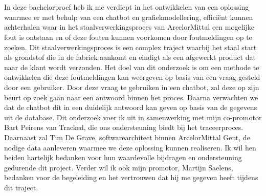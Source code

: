 
\chapter*{}%
\label{ch:voorwoord}

In deze bachelorproef heb ik me verdiept in het ontwikkelen van een oplossing waarmee er met behulp van een chatbot en grafiekmodellering, efficiënt kunnen achterhalen waar in het staalverwerkingsproces van ArcelorMittal een mogelijke fout is ontstaan en of deze fouten kunnen voorkomen door foutmeldingen op te zoeken. 
Dit staalverwerkingsproces is een complex traject waarbij het staal start als grondstof die in de fabriek aankomt en eindigt als een afgewerkt product dat naar de klant wordt verzonden.
Het doel van dit onderzoek is om een methode te ontwikkelen die deze foutmeldingen kan weergeven op basis van een vraag gesteld door een gebruiker.
Door deze vraag te gebruiken in een chatbot, zal deze op zijn beurt op zoek gaan naar een antwoord binnen het proces. Daarna verwachten we dat de chatbot dit in een duidelijk antwoord kan geven op basis van de gegevens uit de database.
Dit onderzoek voer ik uit in samenwerking met mijn co-promotor Bart Peirens van Tracked, die ons ondersteuning biedt bij het traceerproces. 
Daarnaast zal Tim De Grave, softwarearchitect binnen ArcelorMittal Gent, de nodige data aanleveren waarmee we deze oplossing kunnen realiseren. 
Ik wil hen beiden hartelijk bedanken voor hun waardevolle bijdragen en ondersteuning gedurende dit project. Verder wil ik ook mijn promotor, Martijn Saelens, bedanken voor de begeleiding en het vertrouwen dat hij me gegeven heeft tijdens dit traject.
